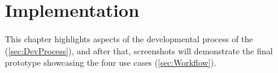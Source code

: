 \chapter{Implementation}
\label{ch:Implementation}

This chapter highlights aspects of the developmental process of the  (\autoref{sec:DevProcess}), and after that, screenshots will demonstrate the final prototype showcasing the four use cases (\autoref{sec:Workflow}).
